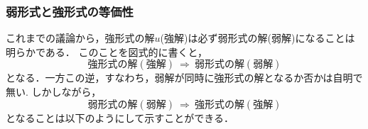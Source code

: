 \documentclass[10pt,a4j]{jarticle}
\begin{document}
\subsubsection{弱形式と強形式の等価性}
これまでの議論から，強形式の解$u$(強解)は必ず弱形式の解(弱解)になることは明らかである．
このことを図式的に書くと，
\begin{equation}
	強形式の解(強解) \ \Rightarrow \ 弱形式の解(弱解)
	\label{eqn:prop_s2w}
\end{equation}
となる．一方この逆，すなわち，弱解が同時に強形式の解となるか否かは自明で無い.
しかしながら，
\begin{equation}
	弱形式の解(弱解) \ \Rightarrow \ 強形式の解(強解)
	\label{eqn:prop_w2s}
\end{equation}
となることは以下のようにして示すことができる．\\
\end{document}
